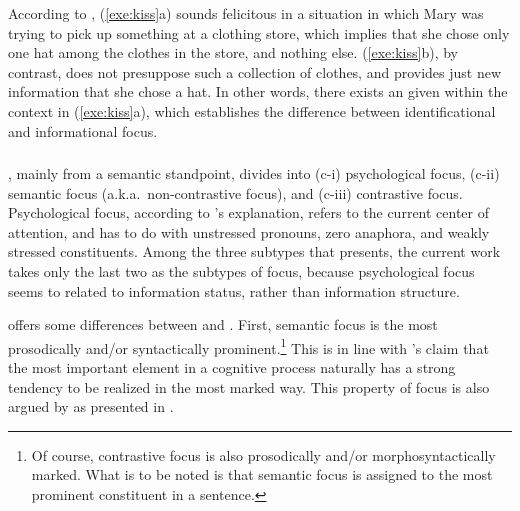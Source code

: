 

\noindent According to \citeauthor{kiss:98}, (\ref{exe:kiss}a) sounds
felicitous in a situation in which Mary was trying to pick up
something at a clothing store, which implies that she chose only one
hat among the clothes in the store, and nothing
else. (\ref{exe:kiss}b), by contrast, does not presuppose such a
collection of clothes, and provides just new information that she
chose a hat. In other words, there exists an  given
within the context in (\ref{exe:kiss}a), which establishes the
difference between identificational  and informational focus.



\subsubsection{\citet{gundel:99}}
\label{3:sssec:gundel}


\citeauthor{gundel:99}, mainly from a semantic standpoint, divides
 into (c-i) psychological focus, (c-ii) semantic focus
(a.k.a.\ non-contrastive focus), and (c-iii) contrastive
focus. Psychological focus, according to \citeauthor{gundel:99}'s
explanation, refers to the current center of attention, and has to do
with unstressed pronouns, zero anaphora, and weakly stressed
constituents.  Among the three subtypes that \citeauthor{gundel:99}
presents, the current work takes only the last two as the subtypes of
focus, because psychological focus seems to related to information
status, rather than information structure.






\citeauthor{gundel:99} offers some differences between 
and .  First, semantic focus is the most
prosodically and/or syntactically prominent.\footnote{Of course,
  contrastive focus is also prosodically and/or morphosyntactically
  marked. What is to be noted is that semantic focus is assigned to
  the most prominent constituent in a sentence.} This is in line with
\citet{givon:91}'s claim that the most important element in a
cognitive process naturally has a strong tendency to be realized in
the most marked way. This property of focus is also argued by
\citet{buring:10} as presented in .

